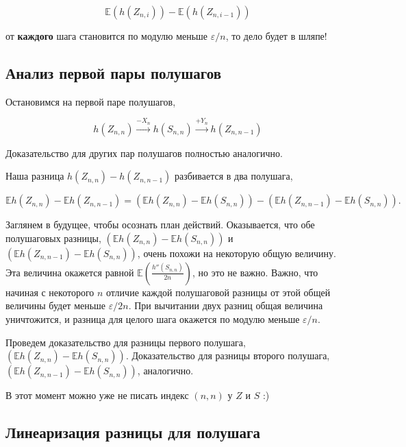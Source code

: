 \documentclass[
  letterpaper,
  DIV=11,
  numbers=noendperiod]{scrartcl}
\newcommand\E{{\mathbb{E}}}
\begin{document}
\[
\E(h(Z_{n,i})) - \E(h(Z_{n,i-1}))
\]

от \textbf{каждого} шага становится по модулю меньше \(\varepsilon/n\),
то дело будет в шляпе!

\hypertarget{ux430ux43dux430ux43bux438ux437-ux43fux435ux440ux432ux43eux439-ux43fux430ux440ux44b-ux43fux43eux43bux443ux448ux430ux433ux43eux432}{%
\subsection{Анализ первой пары
полушагов}\label{ux430ux43dux430ux43bux438ux437-ux43fux435ux440ux432ux43eux439-ux43fux430ux440ux44b-ux43fux43eux43bux443ux448ux430ux433ux43eux432}}

Остановимся на первой паре полушагов,

\[
h(Z_{n,n}) \overset{-X_n}{\longrightarrow}h(S_{n,n})\overset{+Y_n}{\longrightarrow}h(Z_{n,n-1})
\]

Доказательство для других пар полушагов полностью аналогично.

Наша разница \(h(Z_{n,n}) - h(Z_{n,n-1})\) разбивается в два полушага,

\[
\E h(Z_{n,n}) - \E h(Z_{n,n-1}) = \left(\E h(Z_{n,n}) - \E h(S_{n,n}) \right) - \left(\E h(Z_{n,n-1}) - \E h(S_{n,n}) \right).
\]

Заглянем в будущее, чтобы осознать план действий. Оказывается, что обе
полушаговых разницы, \(\left(\E h(Z_{n,n}) - \E h(S_{n,n}) \right)\) и
\(\left(\E h(Z_{n,n-1}) - \E h(S_{n,n}) \right)\), очень похожи на
некоторую общую величину. Эта величина окажется равной
\(\E\left(\frac{h''(S_{n,n})}{2n}\right)\), но это не важно. Важно, что
начиная с некоторого \(n\) отличие каждой полушаговой разницы от этой
общей величины будет меньше \(\varepsilon/2n\). При вычитании двух
разниц общая величина уничтожится, и разница для целого шага окажется по
модулю меньше \(\varepsilon/n\).

Проведем доказательство для разницы первого полушага,
\(\left(\E h(Z_{n,n}) - \E h(S_{n,n}) \right)\). Доказательство для
разницы второго полушага,
\(\left(\E h(Z_{n,n-1}) - \E h(S_{n,n}) \right)\), аналогично.

В этот момент можно уже не писать индекс \((n,n)\) у \(Z\) и \(S\) :)

\hypertarget{ux43bux438ux43dux435ux430ux440ux438ux437ux430ux446ux438ux44f-ux440ux430ux437ux43dux438ux446ux44b-ux434ux43bux44f-ux43fux43eux43bux443ux448ux430ux433ux430}{%
\subsection{Линеаризация разницы для
полушага}\label{ux43bux438ux43dux435ux430ux440ux438ux437ux430ux446ux438ux44f-ux440ux430ux437ux43dux438ux446ux44b-ux434ux43bux44f-ux43fux43eux43bux443ux448ux430ux433ux430}}
\end{document}

